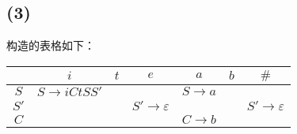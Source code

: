 \documentclass[UTF8]{ctexart}
\begin{document}
    \subsection*{(3)}
        构造的表格如下：
        
        \begin{tabular}{|c|c|c|c|c|c|c|}
            \hline
            & $i$ & $t$ & $e$ & $a$ & $b$ & $\#$ \\
            \hline
            $S$ & $S\to iCtSS'$ & & & $S\to a$ & & \\
            \hline
            $S'$ & & & $S'\to \varepsilon$ & & & $S'\to \varepsilon$ \\
            \hline
            $C$ & & & & $C\to b$ & \\
            \hline
        \end{tabular}
\end{document}
